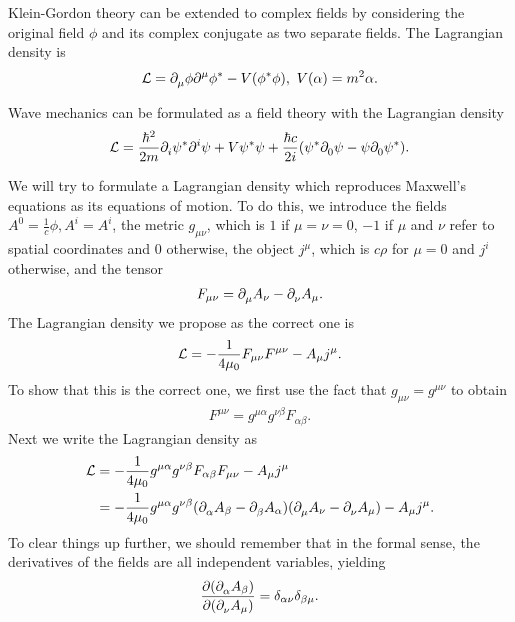 Klein-Gordon theory can be extended to complex fields by considering the original field $\phi$ and its complex conjugate as two separate fields. The Lagrangian density is
\begin{align*}
	\lag = \del{\mu}{\phi}\del[\mu]{}{\cc{\phi}} - V(\cc{\phi}\phi),\ V(\alpha) = m^{2}\alpha.
\end{align*}

Wave mechanics can be formulated as a field theory with the Lagrangian density
\begin{align*}
	\lag = \frac{\hbar^{2}}{2m}\del{i}{\cc{\psi}}\del[i]{}{\psi} + V\cc{\psi}\psi + \frac{\hbar c}{2i}(\cc{\psi}\del{0}{\psi} - \psi\del{0}{\cc{\psi}}).
\end{align*}

We will try to formulate a Lagrangian density which reproduces Maxwell's equations as its equations of motion. To do this, we introduce the fields $A^{0} = \frac{1}{c}\phi, A^{i} = A^{i}$, the metric $g_{\mu\nu}$, which is $1$ if $\mu = \nu = 0$, $-1$ if $\mu$ and $\nu$ refer to spatial coordinates and $0$ otherwise, the object $j^{\mu}$, which is $c\rho$ for $\mu = 0$ and $j^{i}$ otherwise, and the tensor
\begin{align*}
	F_{\mu\nu} = \del{\mu}{A_{\nu}} - \del{\nu}{A_{\mu}}.
\end{align*}
The Lagrangian density we propose as the correct one is
\begin{align*}
	\lag = -\frac{1}{4\mu_{0}}F_{\mu\nu}F^{\mu\nu} - A_{\mu}j^{\mu}.
\end{align*}
To show that this is the correct one, we first use the fact that $g_{\mu\nu} = g^{\mu\nu}$ to obtain
\begin{align*}
	F^{\mu\nu} = g^{\mu\alpha}g^{\nu\beta}F_{\alpha\beta}.
\end{align*}
Next we write the Lagrangian density as
\begin{align*}
	\lag &= -\frac{1}{4\mu_{0}}g^{\mu\alpha}g^{\nu\beta}F_{\alpha\beta}F_{\mu\nu} - A_{\mu}j^{\mu} \\
	     &= -\frac{1}{4\mu_{0}}g^{\mu\alpha}g^{\nu\beta}(\del{\alpha}{A_{\beta}} - \del{\beta}{A_{\alpha}})(\del{\mu}{A_{\nu}} - \del{\nu}{A_{\mu}}) - A_{\mu}j^{\mu}.
\end{align*}
To clear things up further, we should remember that in the formal sense, the derivatives of the fields are all independent variables, yielding
\begin{align*}
	\pdv{(\del{\alpha}{A_{\beta}})}{(\del{\nu}{A_{\mu}})} = \delta_{\alpha\nu}\delta_{\beta\mu}.
\end{align*}
